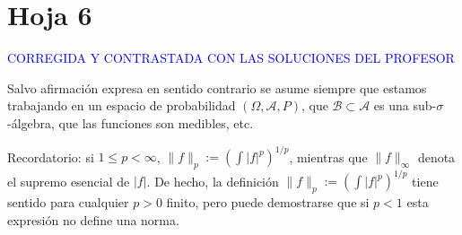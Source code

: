 

\newpage
\section{Hoja 6}

\textcolor{blue}{CORREGIDA Y CONTRASTADA CON LAS SOLUCIONES DEL PROFESOR}

Salvo afirmaci\'on expresa en sentido
contrario se asume siempre que estamos trabajando en un espacio de probabilidad $(\Omega, \mathcal{A}, P)$,
que  $\mathcal{B}\subset \mathcal{A}$ es una sub-$\sigma$-\'algebra, que las funciones son medibles, etc.

Recordatorio: si $1\le p < \infty$, $\|f\|_p := \left(\int|f|^p\right)^{1/p}$, mientras que
$\|f\|_\infty$ denota el supremo esencial de $|f|$. De hecho, la definici\'on
 $\|f\|_p := \left(\int|f|^p\right)^{1/p}$ tiene sentido para cualquier $p > 0$ finito, pero puede
demostrarse que si $p < 1$ esta expresi\'on no define una norma.



